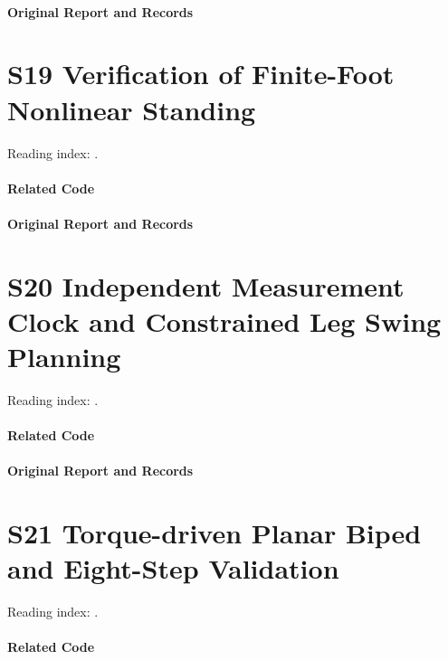\paragraph{Original Report and Records}
\noindent{}\par
\section*{S19 Verification of Finite-Foot Nonlinear Standing}
\hypertarget{code-s19}{}
Reading index: .
\paragraph{Related Code}
\noindent{}\par
\paragraph{Original Report and Records}
\noindent{}\par
\section*{S20 Independent Measurement Clock and Constrained Leg Swing Planning}
\hypertarget{code-s20}{}
Reading index: .
\paragraph{Related Code}
\noindent{}\par
\paragraph{Original Report and Records}
\noindent{}\par
\section*{S21 Torque-driven Planar Biped and Eight-Step Validation}
\hypertarget{code-s21}{}
Reading index: .
\paragraph{Related Code}
\noindent{}\par
